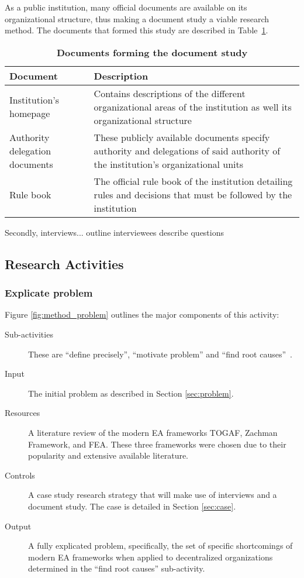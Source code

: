 As a public institution, many official documents are available on its organizational structure, thus making a document study a viable research method. The documents that formed this study are described in Table~\ref{tab:doc_study}.

\begin{table}  
  \begin{tabular}[c]{| p{} |
                       p{} | }
    \hline
    \textbf{Document} & \textbf{Description} \\
    \hline
    Institution's homepage & Contains descriptions of the different organizational areas of the institution as well its organizational structure \\
    \hline
    Authority delegation documents & These publicly available documents specify authority and delegations of said authority of the institution's organizational units \\
    \hline
    Rule book & The official rule book of the institution detailing rules and decisions that must be followed by the institution \\
    \hline
  \end{tabular}
  \caption{\textbf{Documents forming the document study}}
  \label{tab:doc_study}
\end{table}

Secondly, interviews...
  outline interviewees
  describe questions



\subsection{Research Activities}
\subsubsection*{Explicate problem}

Figure \ref{fig:method_problem} outlines the major components of this activity:
\begin{description}
  \item[Sub-activities] These are ``define precisely'', ``motivate problem'' and ``find root causes''~\cite[Ch. 5]{johannessonPerjons2012}.
  \item[Input] The initial problem as described in Section \ref{sec:problem}.
  \item[Resources] A literature review of the modern EA frameworks TOGAF, Zachman Framework, and FEA. These three frameworks were chosen due to their popularity and extensive available literature.
  \item[Controls] A case study research strategy that will make use of interviews and a document study. The case is detailed in Section \ref{sec:case}. 
  \item[Output] A fully explicated problem, specifically, the set of specific shortcomings of modern EA frameworks when applied to decentralized organizations determined in the ``find root causes'' sub-activity.
\end{description}

